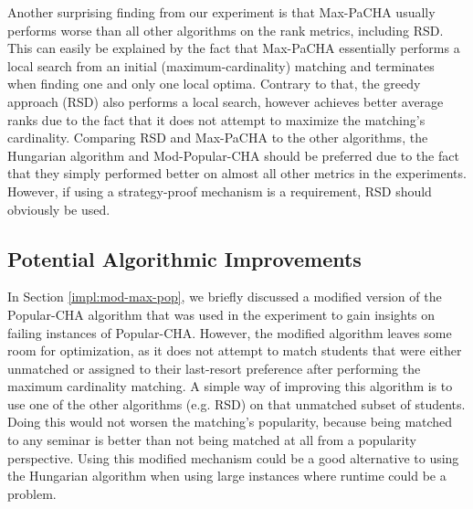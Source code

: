Another surprising finding from our experiment is that Max-PaCHA usually performs worse than all other algorithms on the rank metrics, including RSD. This can easily be explained by the fact that Max-PaCHA essentially performs a local search from an initial (maximum-cardinality) matching and terminates when finding one and only one local optima. Contrary to that, the greedy approach (RSD) also performs a local search, however achieves better average ranks due to the fact that it does not attempt to maximize the matching's cardinality. Comparing RSD and Max-PaCHA to the other algorithms, the Hungarian algorithm and Mod-Popular-CHA should be preferred due to the fact that they simply performed better on almost all other metrics in the experiments. However, if using a strategy-proof mechanism is a requirement, RSD should obviously be used.

\subsection{Potential Algorithmic Improvements}\label{sec:improvements}
In Section \ref{impl:mod-max-pop}, we briefly discussed a modified version of the Popular-CHA algorithm that was used in the experiment to gain insights on failing instances of Popular-CHA. However, the modified algorithm leaves some room for optimization, as it does not attempt to match students that were either unmatched or assigned to their last-resort preference after performing the maximum cardinality matching. A simple way of improving this algorithm is to use one of the other algorithms (e.g. RSD) on that unmatched subset of students. Doing this would not worsen the matching's popularity, because being matched to any seminar is better than not being matched at all from a popularity perspective. Using this modified mechanism could be a good alternative to using the Hungarian algorithm when using large instances where runtime could be a problem. 

